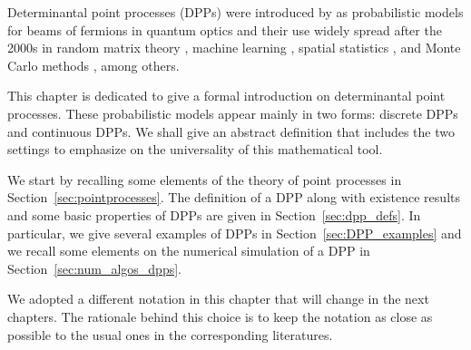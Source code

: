 \documentclass[twoside,11pt]{book}
\numberwithin{theorem}{chapter}
\numberwithin{definition}{chapter}
\numberwithin{proposition}{chapter}
\numberwithin{corollary}{chapter}
\numberwithin{example}{chapter}
\numberwithin{lemma}{chapter}
\numberwithin{assumption}{chapter}
\begin{document}
Determinantal point processes (DPPs) were introduced by \cite{Mac75} as probabilistic models for beams of fermions in quantum optics and their use widely spread after the 2000s in random matrix theory \citep{Joh05}, machine learning \citep{KuTa12}, spatial statistics \citep{LaMoRu15}, and Monte Carlo methods \citep{BaHa16}, among others.







This chapter is dedicated to give a formal introduction on determinantal point processes. These probabilistic models appear mainly in two forms: discrete DPPs and continuous DPPs. We shall give an abstract definition that includes the two settings to emphasize on the universality of this mathematical tool.




We start by recalling some elements of the theory of point processes in Section~\ref{sec:pointprocesses}. The definition of a DPP along with existence results and some basic properties of DPPs are given in Section~\ref{sec:dpp_defs}. In particular, we give several examples of DPPs in Section~\ref{sec:DPP_examples} and we recall some elements on the numerical simulation of a DPP in Section~\ref{sec:num_algos_dpps}.

We adopted a different notation in this chapter that will change in the next chapters. The rationale behind this choice is to keep the notation as close as possible to the usual ones in the corresponding literatures.




\end{document}
